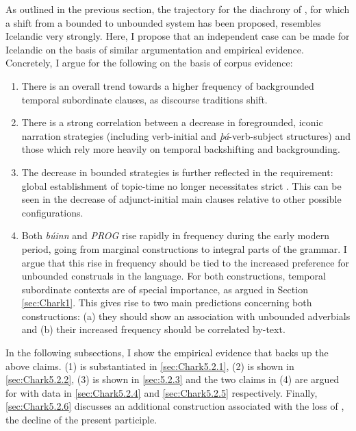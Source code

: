 \documentclass[output=paper,colorlinks,citecolor=brown]{langscibook}
\begin{document}
As outlined in the previous section, the trajectory for the diachrony of , for which a shift from a bounded to unbounded system has been proposed, resembles Icelandic very strongly. Here, I propose that an independent case can be made for Icelandic on the basis of similar argumentation and empirical evidence. Concretely, I argue for the following on the basis of corpus evidence:
\begin{enumerate}
    \item There is an overall trend towards a higher frequency of backgrounded temporal subordinate clauses, as discourse traditions shift.
    \item There is a strong correlation between a decrease in foregrounded, iconic narration strategies (including verb-initial and \textit{þá}-verb-subject structures) and those which rely more heavily on temporal backshifting and backgrounding.
    \item The decrease in bounded strategies is further reflected in the   requirement: global establishment of topic-time no longer necessitates strict . This can be seen in the decrease of adjunct-initial main clauses relative to other possible configurations.
    \item Both \textit{búinn} and \textit{PROG} rise rapidly in frequency during the early modern period, going from marginal constructions to integral parts of the grammar. I argue that this rise in frequency should be tied to the increased preference for unbounded construals in the language. For both constructions, temporal subordinate contexts are of special importance, as argued in Section \ref{sec:Chark1}. This gives rise to two main predictions concerning both constructions: (a) they should show an association with unbounded adverbials and (b) their increased frequency should be correlated by-text.
\end{enumerate}

In the following subsections, I show the empirical evidence that backs up the above claims. (1) is substantiated in \ref{sec:Chark5.2.1}, (2) is shown in \ref{sec:Chark5.2.2}, (3) is shown in \ref{sec:5.2.3} and the two claims in (4) are argued for with data in \ref{sec:Chark5.2.4} and \ref{sec:Chark5.2.5} respectively. Finally, \ref{sec:Chark5.2.6} discusses an additional construction associated with the loss of , the decline of the present participle.
\end{document}
